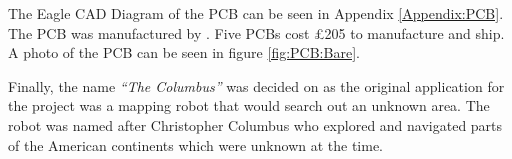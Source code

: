 The Eagle CAD Diagram of the PCB can be seen in Appendix \ref{Appendix:PCB}. The PCB was manufactured by \cite{PCBCart}. Five PCBs cost \pounds 205 to manufacture and ship. A photo of the PCB can be seen in figure \ref{fig:PCB:Bare}. 

Finally, the name \textit{``The Columbus''} was decided on as the original application for the project was a mapping robot that would search out an unknown area. The robot was named after Christopher Columbus who explored and navigated parts of the American continents which were unknown at the time. 

\begin{figure}
\centering
{}

\end{figure}
